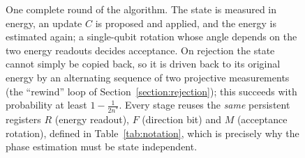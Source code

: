 \documentclass[aps,floatfix,10pt,amssymb,amsfont,amsmath,superscriptaddress,float,nofootinbib,longbibliography,nobalancelastpage,twocolumn]{revtex4-2}
\begin{document}
\begin{figure}
{}
\caption{One complete round of the algorithm. The state is measured in energy, an update $C$ is proposed and applied, and the energy is estimated again; a single-qubit rotation whose angle depends on the two energy readouts decides acceptance. On rejection the state cannot simply be copied back, so it is driven back to its original energy by an alternating sequence of two projective measurements (the ``rewind'' loop of Section~\ref{section:rejection}); this succeeds with probability at least $1-\frac{1}{2n^*}$. Every stage reuses the \emph{same} persistent registers $R$ (energy readout), $F$ (direction bit) and $M$ (acceptance rotation), defined in Table~\ref{tab:notation}, which is precisely why the phase estimation must be state independent.}
\label{fig:overview}
\end{figure}
\end{document}
